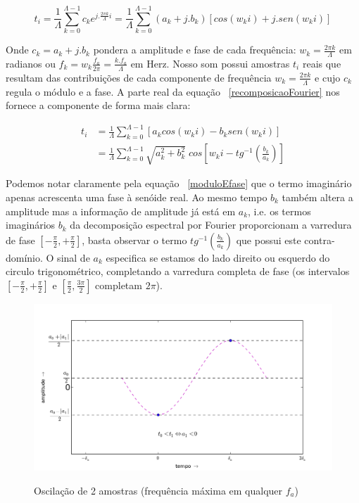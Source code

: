  
\begin{equation}\label{recomposicaoFourier}
t_i = \frac{1}{\Lambda}\sum_{k=0}^{\Lambda-1}c_ke^{j . \frac{2\pi k}{\Lambda} i } = \frac{1}{\Lambda}\sum_{k=0}^{\Lambda-1}(a_k+ j . b_k)\left[cos(w_k i) +j . sen(w_k i)\right]
\end{equation}

Onde $c_k = a_k + j . b_k$ pondera a amplitude e fase de cada frequência: $w_k=\frac{2\pi k}{\Lambda}$ em radianos ou $f_k=w_k\frac{f_a}{2\pi}=\frac{k.f_a}{\Lambda}$ em Herz. Nosso som possui amostras $t_i$ reais que resultam das contribuições de cada componente de frequência $w_k=\frac{2\pi k}{\Lambda}$ e cujo $c_k$ regula o módulo e a fase. A parte real da equação ~\ref{recomposicaoFourier} nos fornece a componente de forma mais clara:

\begin{equation}\label{moduloEfase}
\begin{split}
t_i& = \frac{1}{\Lambda}\sum_{k=0}^{\Lambda-1}\left[a_k cos(w_k i) -b_k sen(w_k i)\right] \\
   & = \frac{1}{\Lambda}\sum_{k=0}^{\Lambda-1}\sqrt{a_k^2 + b_k^2} \; cos\left[w_k i - tg^{-1}\left(\frac{b_k}{a_k}\right)\right]
\end{split}
\end{equation}

Podemos notar claramente pela equação ~\ref{moduloEfase} que o termo imaginário apenas acrescenta uma fase à senóide real. Ao mesmo tempo $b_k$ também altera a amplitude mas a informação de amplitude já está em $a_k$,
i.e. os termos imaginários $b_k$ da decomposição espectral por Fourier proporcionam a varredura de fase
 $[-\frac{\pi}{2},+\frac{\pi}{2}]$, basta observar o termo $tg^{-1}\left (\frac{b_k}{a_k}\right )$ que possui este contra-domínio. O sinal de $a_k$ especifica se estamos do lado direito ou esquerdo do circulo trigonométrico, completando a varredura completa de fase (os intervalos $[-\frac{\pi}{2},+\frac{\pi}{2}]$ e $[\frac{\pi}{2},\frac{3\pi}{2}]$ completam $2\pi$).


\begin{figure}[h!]
    \centering
    \caption{Oscilação de 2 amostras (frequência máxima em qualquer $f_a$)}
        \includegraphics[width=\textwidth]{figuras/amostras2c_}
        \label{fig:amostras2}
\end{figure}

